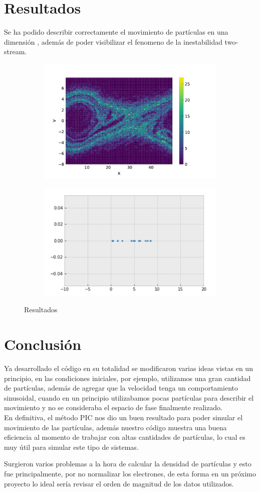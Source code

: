 \documentclass{article}
\begin{document}
	\section{Resultados}
	
	Se ha podido describir correctamente el movimiento de partículas en una dimensión , además de poder visibilizar el fenomeno de la inestabilidad two-stream.
	
	\begin{figure}[h]
		\begin{subfigure}
			\centering
			\includegraphics[width=.5\linewidth]{inestabilidad.pdf}
			\label{fig:sfig1}
		\end{subfigure}%
		\begin{subfigure}
			\centering
			\includegraphics[width=.5\linewidth]{particulas.pdf}
			\label{fig:particulas}
		\end{subfigure}
		\caption{Resultados}
		\label{fig:resultados}
	\end{figure}
	
	\section{Conclusión}
	
	Ya desarrollado el código en su totalidad se modificaron varias ideas vistas en un principio, en las condiciones iniciales, por ejemplo, utilizamos una gran cantidad de partículas, además de agregar que la velocidad tenga un comportamiento sinusoidal, cuando en un principio utilizabamos pocas partículas para describir el movimiento y no se consideraba el espacio de fase finalmente realizado.\\
	
	En definitiva, el método PIC nos dio un buen resultado para poder simular el movimiento de las partículas, además nuestro código muestra una buena eficiencia al momento de trabajar con altas cantidades de partículas, lo cual es muy útil para simular este tipo de sistemas.
	
	Surgieron varios problemas a la hora de calcular la densidad de partículas y esto fue principalmente, por no normalizar los electrones, de esta forma en un próximo proyecto lo ideal sería revisar el orden de magnitud de los datos utilizados.
	
	
	
	
	
\end{document}
